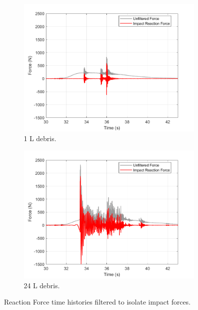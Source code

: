 \documentclass{article}
\begin{document}
{\begin{figure}[h!]
    \centering
    \begin{subfigure}[b]{0.48\textwidth}
        \centering
        \includegraphics[width=\textwidth]{Reg_Lift_U_1_L_D__Masters_NHERIDeprisImpact2_goodtests_Reg_Lift_U_1_L_Trial04_Peak.png}
        \caption{1 L debris.}
        \label{fig:timehist_1L_peak}
    \end{subfigure}
    \hfill
    \begin{subfigure}[b]{0.48\textwidth}
        \centering
        \includegraphics[width=\textwidth]{Reg_Lift_U_24_L_D__Masters_NHERIDeprisImpact2_goodtests_Reg_Lift_U_24_L_Trial04_Peak.png}
        \caption{24 L debris.}
        \label{fig:timehist_24L_peak}
    \end{subfigure}
    \caption{Reaction Force time histories filtered to isolate impact forces.}
    \label{fig:timehist_combined}
\end{figure}

}
\end{document}

